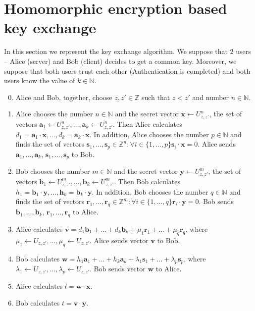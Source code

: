\section{Homomorphic encryption based key exchange}
	In this section we represent the key exchange algorithm. We suppose that 2 users -- Alice (server) and Bob (client) decides to get a common key. Moreover, we suppose that both users trust each other (Authentication is completed) and both users know the value of $ k \in \mathbb{N} $. 
	\begin{enumerate}
		\setcounter{enumi}{-1}
		\item Alice and Bob, together, choose $ z, z' \in \mathbb{Z} $ such that $ z < z' $ and number $ n \in \mathbb{N} $.
		\item Alice chooses the number $ n \in \mathbb{N} $ and the secret vector $ \textbf{x} \leftarrow U_{z, z'}^n $, the set of vectors $ \textbf{a}_1 \leftarrow U_{z, z'}^n, \dots, \textbf{a}_k \leftarrow U_{z, z'}^n $. Then Alice calculates $ d_1 = \textbf{a}_1 \cdot \textbf{x}, \dots, d_k = \textbf{a}_k \cdot \textbf{x} $. In addition, Alice chooses the number $ p \in \mathbb{N} $ and finds the set of vectors $ \textbf{s}_1, \dots, \textbf{s}_p \in \mathbb{Z}^n : \forall i \in \{1, \dots, p\} \textbf{s}_i \cdot \textbf{x} = 0 $. Alice sends $ \textbf{a}_1, \dots, \textbf{a}_k $, $ \textbf{s}_1, \dots, \textbf{s}_p $ to Bob.
		\item Bob chooses the number $ m \in \mathbb{N} $ and the secret vector $ \textbf{y} \leftarrow U_{z, z'}^m $, the set of vectors $ \textbf{b}_1 \leftarrow U_{z, z'}^m, \dots, \textbf{b}_k \leftarrow U_{z, z'}^m $. Then Bob calculates $ h_1 = \textbf{b}_1 \cdot \textbf{y}, \dots, \textbf{h}_k = \textbf{b}_k \cdot \textbf{y} $. In addition, Bob chooses the number $ q \in \mathbb{N} $ and finds the set of vectors $ \textbf{r}_1, \dots, \textbf{r}_q \in \mathbb{Z}^m : \forall i \in \{1, \dots, q\} \textbf{r}_i \cdot \textbf{y} = 0 $. Bob sends $ \textbf{b}_1, \dots, \textbf{b}_k $, $ \textbf{r}_1, \dots, \textbf{r}_q $ to Alice.
		\item Alice calculates $ \textbf{v} = d_1 \textbf{b}_1 + \dots + d_k \textbf{b}_k + \mu_1 \textbf{r}_1 + \dots + \mu_q \textbf{r}_q $, where $ \mu_1 \leftarrow U_{z, z'}, \dots, \mu_q \leftarrow U_{z, z'} $. Alice sends vector $ \textbf{v} $ to Bob.
		\item Bob calculates $ \textbf{w} = h_1 \textbf{a}_1 + \dots + h_k \textbf{a}_k + \lambda_1 \textbf{s}_1 + \dots + \lambda_p \textbf{s}_p $, where $ \lambda_1 \leftarrow U_{z, z'}, \dots, \lambda_p \leftarrow U_{z, z'}$. Bob sends vector $ \textbf{w} $ to Alice.
		\item Alice calculates $ l = \textbf{w} \cdot \textbf{x} $.
		\item Bob calculates $ t = \textbf{v} \cdot \textbf{y} $.
	\end{enumerate}
